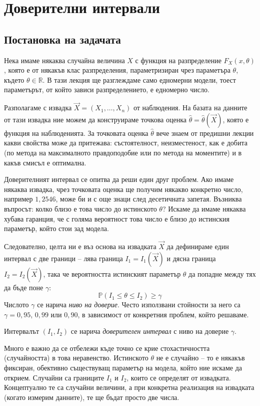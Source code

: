 \documentclass{article}
\begin{document}
\section{Доверителни интервали}

\subsection{Постановка на задачата}
Нека имаме някаква случайна величина $X$ с функция на разпределение $F_X(x, \theta)$, която е от някакъв клас разпределения, параметризиран чрез параметъра $\theta$, където $\theta \in \mathbb{R}$. В тази лекция ще разглеждаме само едномерни модели, тоест параметърът, от който зависи разпределението, е едномерно число.

Разполагаме с извадка $\vec{X} = (X_1, \dots, X_n)$ от наблюдения. На базата на данните от тази извадка ние можем да конструираме точкова оценка $\hat{\theta} = \hat{\theta}(\vec{X})$, която е функция на наблюденията. За точковата оценка $\hat{\theta}$ вече знаем от предишни лекции какви свойства може да притежава: състоятелност, неизместеност, как е добита (по метода на максималното правдоподобие или по метода на моментите) и в какъв смисъл е оптимална.

Доверителният интервал се опитва да реши един друг проблем. Ако имаме някаква извадка, чрез точковата оценка ще получим някакво конкретно число, например $1,2546$, може би и с още знаци след десетичната запетая. Възниква въпросът: колко близо е това число до истинското $\theta$? Искаме да имаме някаква хубава гаранция, че с голяма вероятност това число е близо до истинския параметър, който стои зад модела. 

Следователно, целта ни е въз основа на извадката $\vec{X}$ да дефинираме един интервал с две граници – лява граница $I_1 = I_1(\vec{X})$ и дясна граница $I_2 = I_2(\vec{X})$, така че вероятността истинският параметър $\theta$ да попадне между тях да бъде поне $\gamma$:
\[
\mathbb{P}(I_1 \le \theta \le I_2) \ge \gamma
\]
Числото $\gamma$ се нарича \textit{ниво на доверие}. Често използвани стойности за него са $\gamma = 0,95$, $0,99$ или $0,90$, в зависимост от конкретния проблем, който решаваме.

Интервалът $(I_1, I_2)$ се нарича \textit{доверителен интервал} с ниво на доверие $\gamma$.

Много е важно да се отбележи къде точно се крие стохастичността (случайността) в това неравенство. Истинското $\theta$ не е случайно – то е някакъв фиксиран, обективно съществуващ параметър на модела, който ние искаме да открием. Случайни са границите $I_1$ и $I_2$, които се определят от извадката. Концептуално те са случайни величини, а при конкретна реализация на извадката (когато измерим данните), те ще бъдат просто две числа.
\end{document}
